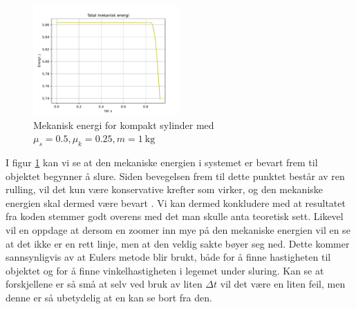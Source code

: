 \documentclass[5p]{elsarticle}
\newcommand{\enhet}[1]{~\mathrm{#1}}  %
\begin{document}
	\begin{figure}[H]
	    \centering
	    \includegraphics[width=0.5\textwidth]{Figure_e}
	    \caption{Mekanisk energi for kompakt sylinder med $\mu_s = 0.5, \mu_k = 0.25, m = 1\enhet{kg}$}
	    \label{energy}
	\end{figure}
	
	I figur \ref{energy} kan vi se at den mekaniske energien i systemet er bevart frem til objektet begynner å slure. Siden bevegelsen frem til dette punktet består av ren rulling, vil det kun være konservative krefter som virker, og den mekaniske energien skal dermed være bevart \cite{Lien}. Vi kan dermed konkludere med at resultatet fra koden stemmer godt overens med det man skulle  anta teoretisk sett. Likevel vil en oppdage at dersom en zoomer inn mye på den mekaniske energien vil en se at det ikke er en rett linje, men at den veldig sakte bøyer seg ned. Dette kommer sannsynligvis av at Eulers metode blir brukt, både for å finne hastigheten til objektet og for å finne vinkelhastigheten i legemet under sluring. Kan se at forskjellene er så små at selv ved bruk av liten $\Delta t$ vil det være en liten feil, men denne er så ubetydelig at en kan se bort fra den.
	
	
	
	
\end{document}
